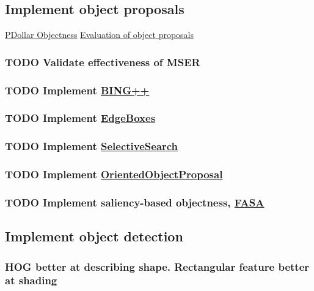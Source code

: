 \documentclass[11pt]{article}
\begin{document}
\subsection{Implement object proposals}
\label{sec:orgcc3824a}
\href{https://pdollar.wordpress.com/2013/12/22/generating-object-proposals/}{PDollar Objectness}
\href{https://rodrigob.github.io/documents/2014\_bmvc\_selective\_search\_with\_supplementary\_material.pdf}{Evaluation of object proposals}
\subsubsection{{\bfseries\sffamily TODO} Validate effectiveness of MSER}
\label{sec:org233addc}
\subsubsection{{\bfseries\sffamily TODO} Implement \href{https://arxiv.org/pdf/1511.04511.pdf}{BING++}}
\label{sec:orgc5210e2}
\subsubsection{{\bfseries\sffamily TODO} Implement \href{http://web.bii.a-star.edu.sg/\~zhangxw/files/EdgeBoxes\_ECCV2014.pdf}{EdgeBoxes}}
\label{sec:orgb347ebb}
\subsubsection{{\bfseries\sffamily TODO} Implement \href{https://ivi.fnwi.uva.nl/isis/publications/2013/UijlingsIJCV2013/UijlingsIJCV2013.pdf}{SelectiveSearch}}
\label{sec:orga86954d}
\subsubsection{{\bfseries\sffamily TODO} Implement \href{http://www.shengfenghe.com/uploads/1/5/1/3/15132160/oop\_iccv15.pdf}{OrientedObjectProposal}}
\label{sec:org58169ba}
\subsubsection{{\bfseries\sffamily TODO} Implement saliency-based objectness, \href{http://ivrl.epfl.ch/research/saliency/fast\_saliency}{FASA}}
\label{sec:org6ce6ff0}
\subsection{Implement object detection}
\label{sec:org868c660}
\subsubsection{HOG better at describing shape. Rectangular feature better at shading}
\label{sec:org10d6a62}
\end{document}
